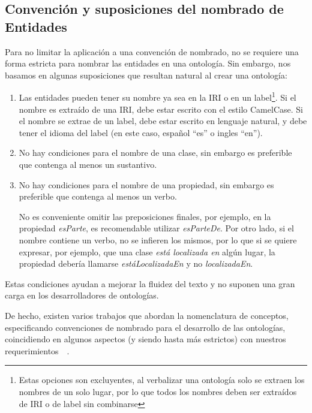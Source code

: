\subsection{Convención y suposiciones del nombrado de Entidades}
Para no limitar la aplicación a una convención de nombrado, no se requiere una forma estricta para nombrar las entidades en una ontología. Sin embargo, nos basamos en algunas suposiciones que resultan natural al crear una ontología:
\begin{enumerate}
    \item Las entidades pueden tener su nombre ya sea en la IRI o en un label\footnote{Estas opciones son excluyentes, al verbalizar una ontología solo se extraen los nombres de un solo lugar, por lo que todos los nombres deben ser extraídos de IRI o de label sin combinarse}. Si el nombre es extraído de una IRI, debe estar escrito con el estilo CamelCase. Si el nombre se extrae de un label, debe estar escrito en lenguaje natural, y debe tener el idioma del label (en este caso, español ``es'' o ingles ``en'').
    \item No hay condiciones para el nombre de una clase, sin embargo es preferible que contenga al menos un sustantivo.
    \item No hay condiciones para el nombre de una propiedad, sin embargo es preferible que contenga al menos un verbo. 
    
    No es conveniente omitir las preposiciones finales, por ejemplo, en la propiedad \emph{esParte}, es recomendable utilizar \emph{esParteDe}. Por otro lado, si el nombre contiene un verbo, no se infieren los mismos, por lo que si se quiere expresar, por ejemplo, que una clase \emph{está localizada en} algún lugar, la propiedad debería llamarse \emph{estáLocalizadaEn} y no \emph{localizadaEn}. 
    
\end{enumerate}

Estas condiciones ayudan a mejorar la fluidez del texto y no suponen una gran carga en los desarrolladores de ontologías.

De hecho, existen varios trabajos que abordan la nomenclatura de conceptos, especificando convenciones de nombrado para el desarrollo de las ontologías, coincidiendo en algunos aspectos (y siendo hasta más estrictos) con nuestros requerimientos~\cite{montiel2011style}~\cite{OntoCheck}.


